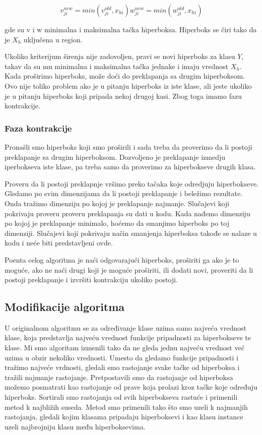 \documentclass[a4paper]{article}
\begin{document}
\begin{equation}
    v_{ji}^{new} = min(v_{ji}^{old}, x_{hi})
    w_{ji}^{new} = min(w_{ji}^{old}, x_{hi})
\end{equation}

gde su v i w minimalna i maksimalna tačka hiperboksa. Hiperboks se čiri tako da je $X_h$ uključena u region.

Ukoliko kriterijum širenja nije zadovoljen, pravi se novi hiperboks za klasu $Y$, takav da su mu minimalna i maksimalna tačka jednake i 
imaju vrednost $X_h$. Kada proširimo hiperboks, može doći do preklapanja sa drugim hiperboksom. Ovo nije toliko problem ako je u 
pitanju hiperboks iz iste klase, ali jeste ukoliko je u pitanju hiperboks koji pripada nekoj drugoj kasi. Zbog toga imamo fazu kontrakcije.\cite{mmf}

\subsubsection{Faza kontrakcije}
\label{kontrakcija}

Pronašli smo hiperboks koji smo proširili i sada treba da proverimo da li postoji preklapanje sa drugim hiperboksom. Dozvoljeno je 
preklapanje izmedju iperbokseva iste klase, pa treba samo da proverimo za hiperbokseve drugih klasa.

Proveru da li postoji preklapnje vršimo preko tačaka koje odredjuju hiperbokseve. Gledamo po svim dimenzijama da li postoji preklapanje i 
beležimo rezultate. Onda tražimo dimenziju po kojoj je preklapanje najmanje. Slučajevi koji pokrivaju proveru proveru preklapanja su dati u 
kodu. Kada nađemo dimenziju po kojoj je preklapanje minimalo, hoćemo da smanjimo hiperboks po toj dimenziji. Slučajevi koji pokrivaju 
način smanjenja hiperboksa takođe se nalaze u kodu i neće biti predstavljeni ovde.

Poenta celog algoritma je naći odgovarajući hiperboks, proširiti ga ako je to moguće, ako ne naći drugi koji je moguće proširiti, ili dodati 
novi, proveriti da li postoji preklapanje i izvršiti kontrakciju ukoliko postoji. \cite{mmf}

\subsection{Modifikacije algoritma}

U originalnom algoritmu se za određivanje klase uzima samo najveća vrednost klase, koja predstavlja najveću vrednost funkcije pripadnosti 
za hiperbokseve te klase. Mi smo algoritam izmenili tako da ne gleda jednu najveću vrednost već uzima u obzir nekoliko vrednosti.
Umesto da gledamo funkcije pripadnosti i tražimo najveće vrdnosti, gledali smo rastojanje svake tačke od hiperboksa i tražili najmanje 
rastojanje. Pretpostavili smo da rastojanje od hiperboksa možemo posmatrati kao rastojanje od prave koja prolazi kroz tačke koje određuju 
hiperboks. Sortirali smo rastojanja od svih hiperbokseva rastuće i primenili metod k najbližih suseda. Metod smo primenili tako što smo 
uzeli k najmanjih rastojanja, gledali kojim klasama pripadaju hiperboksevi i kao klasu instance uzeli najbrojniju klasu među 
hiperboksevima.
\end{document}

